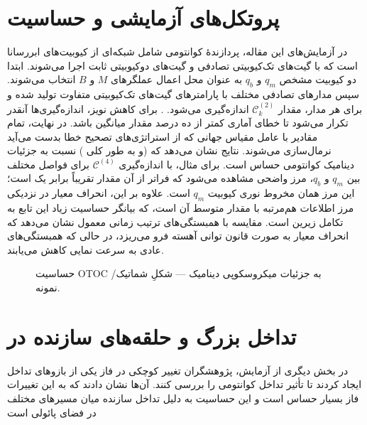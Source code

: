 \section{پروتکل‌های آزمایشی و حساسیت }

در آزمایش‌های این مقاله، پردازندهٔ کوانتومی شامل شبکه‌ای از کیوبیت‌های ابررسانا است که با گیت‌های تک‌کیوبیتی تصادفی و گیت‌های دوکیوبیتی ثابت اجرا می‌شوند. ابتدا دو کیوبیت مشخص \(q_m\) و \(q_b\) به عنوان محل اعمال عملگرهای \(M\) و \(B\) انتخاب می‌شوند. سپس مدارهای تصادفی مختلف با پارامترهای گیت‌های تک‌کیوبیتی متفاوت تولید شده و برای هر مدار، مقدار \(\mathcal{C}_k^{(2)}\) اندازه‌گیری می‌شود.
. برای کاهش نویز، اندازه‌گیری‌ها آنقدر تکرار می‌شود تا خطای آماری کمتر از ده درصد مقدار میانگین باشد.  در نهایت، تمام مقادیر با عامل مقیاس جهانی که از استراتژی‌های تصحیح خطا بدست می‌آید نرمال‌سازی می‌شوند.
نتایج نشان می‌دهد که  (و به طور کلی ) نسبت به جزئیات دینامیک کوانتومی حساس است. برای مثال، با اندازه‌گیری \(\mathcal{C}^{(4)}\) برای فواصل مختلف بین \(q_m\) و \(q_b\)، مرز واضحی مشاهده می‌شود که فراتر از آن مقدار  تقریباً برابر یک است؛ این مرز همان مخروط نوری کیوبیت \(q_m\) است. علاوه بر این، انحراف معیار  در نزدیکی مرز اطلاعات هم‌مرتبه با مقدار متوسط آن است، که بیانگر حساسیت زیاد این تابع به تکامل زیرین است. مقایسه با همبستگی‌های ترتیب زمانی معمول نشان می‌دهد که انحراف معیار  به صورت قانون توانی آهسته فرو می‌ریزد، در حالی که همبستگی‌های عادی به سرعت نمایی کاهش می‌یابند.

\begin{figure}[htbp]
  \centering
  \caption{حساسیت OTOC به جزئیات میکروسکوپی دینامیک — شکلِ شماتیک/نمونه.}
  \label{fig:otoc-sensitivity}
\end{figure}

\section{تداخل بزرگ و حلقه‌های سازنده در }

در بخش دیگری از آزمایش، پژوهشگران تغییر کوچکی در فاز یکی از بازوهای تداخل ایجاد کردند تا تأثیر تداخل کوانتومی را بررسی کنند. آن‌ها نشان دادند که  به این تغییرات فاز بسیار حساس است و این حساسیت به دلیل تداخل سازنده میان مسیرهای مختلف در فضای پائولی است




